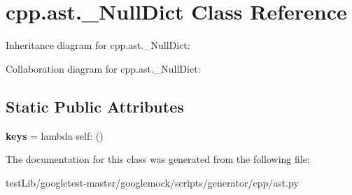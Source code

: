 \hypertarget{classcpp_1_1ast_1_1__NullDict}{}\section{cpp.\+ast.\+\_\+\+Null\+Dict Class Reference}
\label{classcpp_1_1ast_1_1__NullDict}


Inheritance diagram for cpp.\+ast.\+\_\+\+Null\+Dict\+:


Collaboration diagram for cpp.\+ast.\+\_\+\+Null\+Dict\+:
\subsection*{Static Public Attributes}
\begin{DoxyCompactItemize}
\item 
\mbox{\label{classcpp_1_1ast_1_1__NullDict_abb0b7884aa59bede0a8503dffcd1733f}} 
{\bfseries keys} = lambda self\+: ()
\end{DoxyCompactItemize}


The documentation for this class was generated from the following file\+:\begin{DoxyCompactItemize}
\item 
test\+Lib/googletest-\/master/googlemock/scripts/generator/cpp/ast.\+py\end{DoxyCompactItemize}
